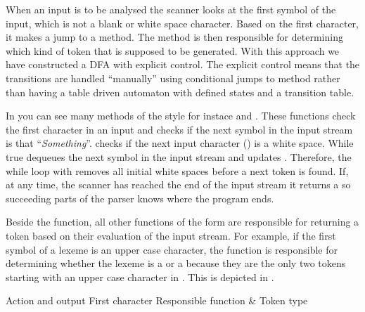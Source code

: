 When an input is to be analysed the scanner looks at the first symbol
of the input, which is not a blank or white space character. Based on
the first character, it makes a jump to a method. The method is
then responsible for determining which kind of token that is supposed to
be generated. With this approach we have constructed a DFA with explicit
control. The explicit control means that the transitions are handled
``manually'' using conditional jumps to method rather than having
a table driven automaton with defined states and a transition table.

In  you can see many methods of the style
 for instace 
and . These functions check the first character
in an input and checks if the next symbol in the input stream is
that ``\textit{Something}''.  checks if
the next input character () is a white space.
While true  dequeues the next symbol in the input
stream and updates . Therefore, the while loop with
 removes all initial white spaces before a
next token is found. If, at any time, the scanner has reached the end of
the input stream it returns a  so succeeding parts of the
parser knows where the program ends.

Beside the  function, all other functions
of the form  are responsible for
returning a token based on their evaluation of the input stream.
For example, if the first symbol of a lexeme is an upper case
character, the function  is responsible
for determining whether the lexeme is a  or a
 because they are the only two tokens starting
with an upper case character in \productname{}. This is depicted in
.

                         {Action and output					            }
       {First character	}{Responsible function	& Token type				    }{
}

